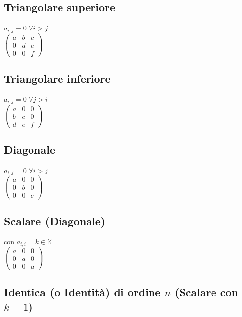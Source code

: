 \documentclass[a4paper, twoside, italian, 11pt]{book}
\newcommand{\K}{\mathbb K}
\begin{document}
\subsection{Triangolare superiore}

$a_{i,j} = 0$ $\forall i > j$ \\

\noindent
$\begin{pmatrix}
a & b & c \\
0 & d & e \\
0 & 0 & f
\end{pmatrix}$


\subsection{Triangolare inferiore}

$a_{i,j} = 0$ $\forall j > i$ \\

\noindent
$\begin{pmatrix}
a & 0 & 0 \\
b & c & 0 \\
d & e & f
\end{pmatrix}$


\subsection{Diagonale}

$a_{i,j} = 0$ $\forall i > j$ \\

\noindent
$\begin{pmatrix}
a & 0 & 0 \\
0 & b & 0 \\
0 & 0 & c
\end{pmatrix}$


\subsection{Scalare (Diagonale)}

con $a_{i,i} = k \in \K$ \\

\noindent
$\begin{pmatrix}
a & 0 & 0 \\
0 & a & 0 \\
0 & 0 & a
\end{pmatrix}$


\subsection{Identica (o Identità) di ordine $n$ (Scalare con $k = 1$)}
\end{document}
